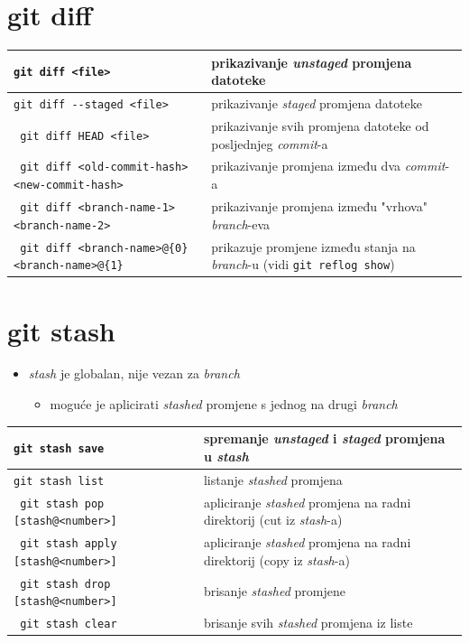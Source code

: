 \documentclass[10pt]{article}
\begin{document}
    \section*{\color{BrickRed} git diff}
    \begin{tabular}{|>{\tt}p{9.00cm}|>{}p{15.50cm}|}
        \hline
        git diff <file>                                         & prikazivanje \textit{unstaged} promjena datoteke \\ \hline
        git diff -{}-staged <file>                              & prikazivanje \textit{staged} promjena datoteke \\ \hline
        git diff HEAD <file>                                    & prikazivanje svih promjena datoteke od posljednjeg \textit{commit}-a \\ \hline
        git diff <old-commit-hash> <new-commit-hash>            & prikazivanje promjena između dva \textit{commit}-a \\ \hline
        git diff <branch-name-1> <branch-name-2>                & prikazivanje promjena između "vrhova" \textit{branch}-eva \\ \hline
        git diff <branch-name>@\{0\} <branch-name>@\{1\}        & prikazuje promjene između stanja na \textit{branch}-u (vidi \texttt{git reflog show}) \\ \hline
    \end{tabular}

    \section*{\color{BrickRed} git stash}
    \begin{itemize}
        \item \textit{stash} je globalan, nije vezan za \textit{branch}
        \begin{itemize}
            \item moguće je aplicirati \textit{stashed} promjene s jednog na drugi \textit{branch}
        \end{itemize}
    \end{itemize}
    \begin{tabular}{|>{\tt}p{9.00cm}|>{}p{15.50cm}|}
        \hline
        git stash save                                  & spremanje \textit{unstaged} i \textit{staged} promjena u \textit{stash} \\ \hline
        git stash list                                  & listanje \textit{stashed} promjena \\ \hline
        git stash pop [stash@{<number>}]                & apliciranje \textit{stashed} promjena na radni direktorij (cut iz \textit{stash}-a) \\ \hline
        git stash apply [stash@{<number>}]              & apliciranje \textit{stashed} promjena na radni direktorij (copy iz \textit{stash}-a) \\ \hline
        git stash drop [stash@{<number>}]               & brisanje \textit{stashed} promjene \\ \hline
        git stash clear                                 & brisanje svih \textit{stashed} promjena iz liste \\ \hline
    \end{tabular}
\end{document}
